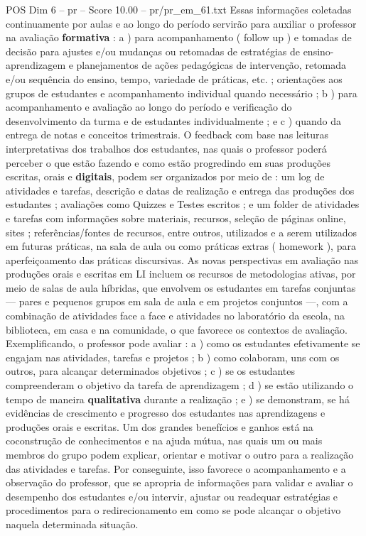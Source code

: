 \begin{textsample}{POS Dim 6 – pr – Score 10.00 – pr/pr\_em\_61.txt}
Essas informações coletadas continuamente por aulas e ao longo do período servirão para auxiliar o professor na avaliação \textbf{formativa} : a ) para acompanhamento ( follow up ) e tomadas de decisão para ajustes e/ou mudanças ou retomadas de estratégias de ensino-aprendizagem e planejamentos de ações pedagógicas de intervenção, retomada e/ou sequência do ensino, tempo, variedade de práticas, etc. ; orientações aos grupos de estudantes e acompanhamento individual quando necessário ; b ) para acompanhamento e avaliação ao longo do período e verificação do desenvolvimento da turma e de estudantes individualmente ; e c ) quando da entrega de notas e conceitos trimestrais.
O feedback com base nas leituras interpretativas dos trabalhos dos estudantes, nas quais o professor poderá perceber o que estão fazendo e como estão progredindo em suas produções escritas, orais e \textbf{digitais}, podem ser organizados por meio de : um log de atividades e tarefas, descrição e datas de realização e entrega das produções dos estudantes ; avaliações como Quizzes e Testes escritos ; e um folder de atividades e tarefas com informações sobre materiais, recursos, seleção de páginas online, sites ; referências/fontes de recursos, entre outros, utilizados e a serem utilizados em futuras práticas, na sala de aula ou como práticas extras ( homework ), para aperfeiçoamento das práticas discursivas.
As novas perspectivas em avaliação nas produções orais e escritas em LI incluem os recursos de metodologias ativas, por meio de salas de aula híbridas, que envolvem os estudantes em tarefas conjuntas — pares e pequenos grupos em sala de aula e em projetos conjuntos —, com a combinação de atividades face a face e atividades no laboratório da escola, na biblioteca, em casa e na comunidade, o que favorece os contextos de avaliação.
Exemplificando, o professor pode avaliar : a ) como os estudantes efetivamente se engajam nas atividades, tarefas e projetos ; b ) como colaboram, uns com os outros, para alcançar determinados objetivos ; c ) se os estudantes compreenderam o objetivo da tarefa de aprendizagem ; d ) se estão utilizando o tempo de maneira \textbf{qualitativa} durante a realização ; e ) se demonstram, se há evidências de crescimento e progresso dos estudantes nas aprendizagens e produções orais e escritas.
Um dos grandes benefícios e ganhos está na coconstrução de conhecimentos e na ajuda mútua, nas quais um ou mais membros do grupo podem explicar, orientar e motivar o outro para a realização das atividades e tarefas.
Por conseguinte, isso favorece o acompanhamento e a observação do professor, que se apropria de informações para validar e avaliar o desempenho dos estudantes e/ou intervir, ajustar ou readequar estratégias e procedimentos para o redirecionamento em como se pode alcançar o objetivo naquela determinada situação.

\end{textsample}
